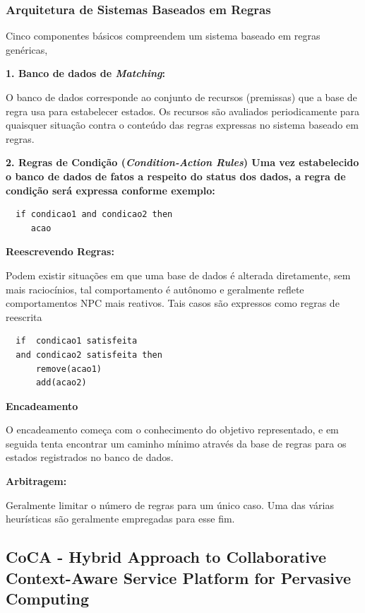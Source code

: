 \documentclass[12pt,a4paper,compsoc]{IEEEtran}
\begin{document}
\subsubsection{Arquitetura de Sistemas Baseados em Regras}

  Cinco componentes básicos compreendem um sistema baseado em regras genéricas,

  \textbf{1. Banco de dados de \textit{Matching}:}

  O banco de dados corresponde ao conjunto de recursos (premissas) que a base de regra usa para
  estabelecer estados. Os recursos são avaliados periodicamente para quaisquer situação contra o
  conteúdo das regras expressas no sistema baseado em regras.

  \textbf{2. Regras de Condição (\textit{Condition-Action Rules}) Uma vez estabelecido o banco de
  dados de fatos a respeito do status dos dados, a regra de condição será expressa conforme exemplo:}

  \begin{lstlisting}
  if condicao1 and condicao2 then
     acao
  \end{lstlisting}

  \textbf{Reescrevendo Regras:}

  Podem existir situações em que uma base de dados é alterada diretamente, sem mais raciocínios,
  tal comportamento é autônomo e geralmente reflete comportamentos NPC mais reativos. Tais casos
  são expressos como regras de reescrita 

  \begin{lstlisting}
  if  condicao1 satisfeita
  and condicao2 satisfeita then
      remove(acao1)
      add(acao2)
  \end{lstlisting}

  \textbf{Encadeamento}
  
  O encadeamento  começa com o conhecimento do objetivo  representado, e em seguida tenta encontrar
  um caminho mínimo através da base de regras para os estados registrados no banco de dados.
  
  \textbf{Arbitragem:}
  
  Geralmente limitar o número de regras para um único caso. Uma das várias heurísticas são 
  geralmente empregadas para esse fim.


\subsection{CoCA - Hybrid Approach to Collaborative Context-Aware Service Platform for Pervasive
 Computing}
\end{document}

